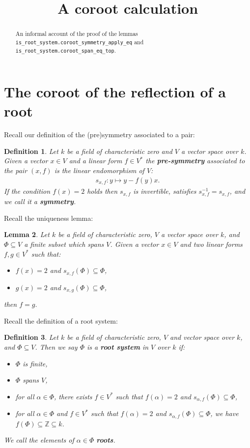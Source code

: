 \documentclass[12pt, a4paper]{article}
\title{A coroot calculation}
\newtheorem{lemma}{Lemma}[section]
\newtheorem{definition}[lemma]{Definition}
\begin{document}
\maketitle

\begin{abstract}
  An informal account of the proof of the lemmas\\
  \texttt{is\_root\_system.coroot\_symmetry\_apply\_eq} and
  \texttt{is\_root\_system.coroot\_span\_eq\_top}.
\end{abstract}

\section{The coroot of the reflection of a root}

Recall our definition of the (pre)symmetry associated to a pair:
\begin{definition}
  Let $k$ be a field of characteristic zero and $V$ a vector space over $k$. Given a vector
  $x \in V$ and a linear form $f \in V^*$ the \textbf{pre-symmetry} associated to the pair $(x, f)$
  is the linear endomorphism of $V$:
  \begin{align*}
    s_{x,f} : y \mapsto y - f(y)x.
  \end{align*}
  If the condition $f(x) = 2$
  holds then $s_{x,f}$ is invertible, satisfies $s_{x,f}^{-1} = s_{x,f}$, and we call it a
  \textbf{symmetry}.
\end{definition}

Recall the uniqueness lemma:
\begin{lemma}\label{lem:uniqueness}
  Let $k$ be a field of characteristic zero, $V$ a vector space over $k$, and $\Phi \subseteq V$
  a finite subset which spans $V$. Given a vector $x \in V$ and two linear forms $f, g \in V^*$
  such that:
  \begin{itemize}
    \item $f(x) = 2$ and $s_{x, f}(\Phi) \subseteq \Phi$,
    \item $g(x) = 2$ and $s_{x, g}(\Phi) \subseteq \Phi$,
  \end{itemize}
  then $f = g$.
\end{lemma}

Recall the definition of a root system:
\begin{definition}
  Let $k$ be a field of characteristic zero, $V$ and vector space over $k$, and
  $\Phi \subseteq V$. Then we say $\Phi$ is a \textbf{root system} in $V$ over $k$ if:
  \begin{itemize}
    \item $\Phi$ is finite,
    \item $\Phi$ spans $V$,
    \item for all $\alpha \in \Phi$, there exists $f \in V^*$ such that $f(\alpha) = 2$ and
    $s_{\alpha, f}(\Phi) \subseteq \Phi$,
    \item for all $\alpha \in \Phi$ and $f \in V^*$ such that $f(\alpha) = 2$ and
    $s_{\alpha, f}(\Phi) \subseteq \Phi$, we have $f(\Phi) \subseteq \mathbb{Z} \subseteq k$.
  \end{itemize}
  We call the elements of $\alpha \in \Phi$ \textbf{roots}.
\end{definition}
\end{document}
